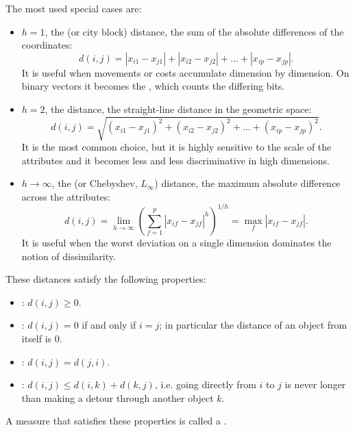 The most used special cases are:
\begin{itemize}
    \item $h=1$, the  (or city block) distance, the sum of the absolute differences of the coordinates:
    \[
        d(i,j)=|x_{i1}-x_{j1}|+|x_{i2}-x_{j2}|+\dots+|x_{ip}-x_{jp}|.
    \]
    It is useful when movements or costs accumulate dimension by dimension. On binary vectors it becomes the , which counts the differing bits.
    \item $h=2$, the  distance, the straight-line distance in the geometric space:
    \[
        d(i,j)=\sqrt{(x_{i1}-x_{j1})^2+(x_{i2}-x_{j2})^2+\dots+(x_{ip}-x_{jp})^2}.
    \]
    It is the most common choice, but it is highly sensitive to the scale of the attributes and it becomes less and less discriminative in high dimensions.
    \item $h\to\infty$, the  (or Chebyshev, $L_\infty$) distance, the maximum absolute difference across the attributes:
    \[
        d(i,j)=\lim_{h\to\infty}\left(\sum_{f=1}^{p}|x_{if}-x_{jf}|^h\right)^{1/h}=\max_{f}|x_{if}-x_{jf}|.
    \]
    It is useful when the worst deviation on a single dimension dominates the notion of dissimilarity.
\end{itemize}

These distances satisfy the following properties:
\begin{itemize}
    \item {}: $d(i,j)\geq 0$.
    \item {}: $d(i,j)=0$ if and only if $i=j$; in particular the distance of an object from itself is $0$.
    \item {}: $d(i,j)=d(j,i)$.
    \item {}: $d(i,j)\leq d(i,k)+d(k,j)$, i.e. going directly from $i$ to $j$ is never longer than making a detour through another object $k$.
\end{itemize}
A measure that satisfies these properties is called a .


